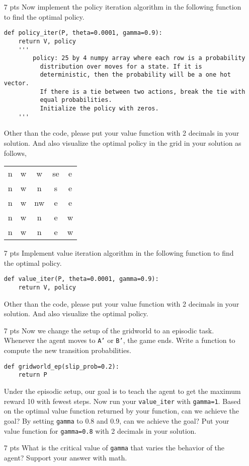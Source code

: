 \begin{enumerate}
    \item [7 pts] Now implement the policy iteration algorithm in the following
    function to find the optimal policy.
    \begin{verbatim}
def policy_iter(P, theta=0.0001, gamma=0.9):
    return V, policy
    '''
        policy: 25 by 4 numpy array where each row is a probability
          distribution over moves for a state. If it is
          deterministic, then the probability will be a one hot vector.
          If there is a tie between two actions, break the tie with
          equal probabilities.
          Initialize the policy with zeros.
    '''
    \end{verbatim}
    Other than the code, please put your value function with 2 decimals
    in your solution. And also visualize the optimal policy in
    the grid in your solution as follows,
    \begin{tabular}{ccccc}
      n & w & w & se & e \\
      n & w & n & s & e \\
      n & w & nw & e & e \\
      n & w & n & e & w \\
      n & w & n & e & w \\
    \end{tabular}

    \item [7 pts] Implement value iteration algorithm in the following
    function to find the optimal policy.
    \begin{verbatim}
def value_iter(P, theta=0.0001, gamma=0.9):
    return V, policy
    \end{verbatim}
    Other than the code, please put your value function with 2 decimals
    in your solution. And also visualize the optimal policy.

    \item [7 pts] Now we change the setup of the gridworld to an episodic task.
    Whenever the agent moves to \texttt{A'} or \texttt{B'}, the game ends.
    Write a function to compute the new transition probabilities.
    \begin{verbatim}
def gridworld_ep(slip_prob=0.2):
    return P
    \end{verbatim}
    Under the episodic setup, our goal is to teach the agent to get the
    maximum reward 10 with fewest steps. Now run your \texttt{value\_iter} with
    \texttt{gamma=1}. Based on the optimal value function returned by your
    function, can we achieve the goal?
    By setting \texttt{gamma} to 0.8 and 0.9, can we achieve the goal?
    Put your value function for \texttt{gamma=0.8} with 2 decimals in your
    solution.

    \item [7 pts] What is the critical value of \texttt{gamma} that varies the behavior of
    the agent? Support your answer with math.
\end{enumerate}
